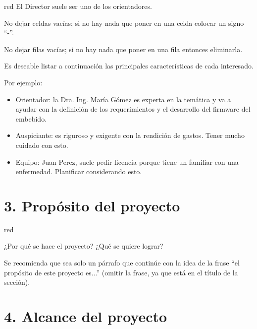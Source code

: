 \documentclass[
11pt, %
]{charter}
\begin{document}
\begin{consigna}{red}
El Director suele ser uno de los orientadores.

No dejar celdas vacías; si no hay nada que poner en una celda colocar un signo ``-''.

No dejar filas vacías; si no hay nada que poner en una fila entonces eliminarla.

Es deseable listar a continuación las principales características de cada interesado.
 
Por ejemplo:
\begin{itemize}
	\item Orientador: la Dra. Ing. María Gómez es experta en la temática y va a ayudar con la definición de los requerimientos y el desarrollo del firmware del embebido.
	\item Auspiciante: es riguroso y exigente con la rendición de gastos. Tener mucho cuidado con esto.
	\item Equipo: Juan Perez, suele pedir licencia porque tiene un familiar con una enfermedad. Planificar considerando esto.
\end{itemize}

\end{consigna} %


\section{3. Propósito del proyecto}
\label{sec:proposito}

\begin{consigna}{red} %

¿Por qué se hace el proyecto? ¿Qué se quiere lograr? 

Se recomienda que sea solo un párrafo que continúe con la idea de la frase ``el propósito de este proyecto es...'' (omitir la frase, ya que está en el título de la sección).
\end{consigna}

\section{4. Alcance del proyecto}
\label{sec:alcance}
\end{document}
